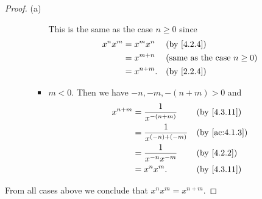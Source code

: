 \begin{proof}{(a)}
\begin{itemize}
\begin{itemize}
\begin{itemize}
                          This is the same as the case \(n \geq 0\) since
                          \begin{align*}
                            x^n x^m & = x^m x^n    &  & \by{4.2.4}                             \\
                                    & = x^{m + n}  &  & \text{(same as the case \(n \geq 0\))} \\
                                    & = x^{n + m}. &  & \by{2.2.4}
                          \end{align*}
                    \item \(m < 0\).
                          Then we have \(-n, -m, -(n + m) > 0\) and
                          \begin{align*}
                            x^{n + m} & = \dfrac{1}{x^{-(n + m)}}    &  & \by{4.3.11}   \\
                                      & = \dfrac{1}{x^{(-n) + (-m)}} &  & \by{ac:4.1.3} \\
                                      & = \dfrac{1}{x^{-n} x^{-m}}   &  & \by{4.2.2}    \\
                                      & = x^n x^m.                   &  & \by{4.3.11}
                          \end{align*}
                  \end{itemize}
          \end{itemize}
  \end{itemize}
  From all cases above we conclude that \(x^n x^m = x^{n + m}\).


\end{proof}

